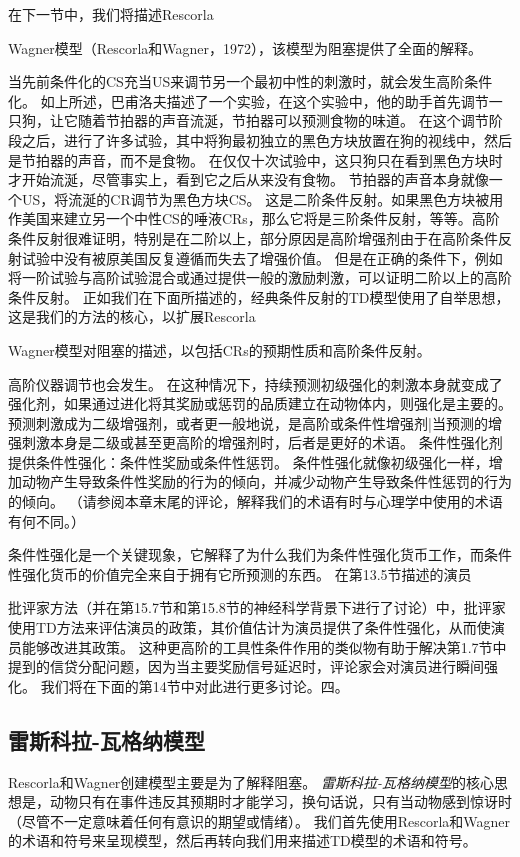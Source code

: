 在下一节中，我们将描述Rescorla{Wagner模型（Rescorla和Wagner，1972），该模型为阻塞提供了全面的解释。
	


当先前条件化的CS充当US来调节另一个最初中性的刺激时，就会发生高阶条件化。
如上所述，巴甫洛夫描述了一个实验，在这个实验中，他的助手首先调节一只狗，让它随着节拍器的声音流涎，节拍器可以预测食物的味道。
在这个调节阶段之后，进行了许多试验，其中将狗最初独立的黑色方块放置在狗的视线中，然后是节拍器的声音，而不是食物。
在仅仅十次试验中，这只狗只在看到黑色方块时才开始流涎，尽管事实上，看到它之后从来没有食物。
节拍器的声音本身就像一个US，将流涎的CR调节为黑色方块CS。
这是二阶条件反射。如果黑色方块被用作美国来建立另一个中性CS的唾液CRs，那么它将是三阶条件反射，等等。高阶条件反射很难证明，特别是在二阶以上，部分原因是高阶增强剂由于在高阶条件反射试验中没有被原美国反复遵循而失去了增强价值。
但是在正确的条件下，例如将一阶试验与高阶试验混合或通过提供一般的激励刺激，可以证明二阶以上的高阶条件反射。
正如我们在下面所描述的，经典条件反射的TD模型使用了自举思想，这是我们的方法的核心，以扩展Rescorla{Wagner模型对阻塞的描述，以包括CRs的预期性质和高阶条件反射。
	
	
高阶仪器调节也会发生。
在这种情况下，持续预测初级强化的刺激本身就变成了强化剂，如果通过进化将其奖励或惩罚的品质建立在动物体内，则强化是主要的。
预测刺激成为二级增强剂，或者更一般地说，是高阶或条件性增强剂|当预测的增强刺激本身是二级或甚至更高阶的增强剂时，后者是更好的术语。
条件性强化剂提供条件性强化：条件性奖励或条件性惩罚。
条件性强化就像初级强化一样，增加动物产生导致条件性奖励的行为的倾向，并减少动物产生导致条件性惩罚的行为的倾向。
（请参阅本章末尾的评论，解释我们的术语有时与心理学中使用的术语有何不同。）



条件性强化是一个关键现象，它解释了为什么我们为条件性强化货币工作，而条件性强化货币的价值完全来自于拥有它所预测的东西。
在第13.5节描述的演员{批评家方法（并在第15.7节和第15.8节的神经科学背景下进行了讨论）中，批评家使用TD方法来评估演员的政策，其价值估计为演员提供了条件性强化，从而使演员能够改进其政策。
这种更高阶的工具性条件作用的类似物有助于解决第1.7节中提到的信贷分配问题，因为当主要奖励信号延迟时，评论家会对演员进行瞬间强化。
我们将在下面的第14节中对此进行更多讨论。四。


\subsection{雷斯科拉-瓦格纳模型}

Rescorla和Wagner创建模型主要是为了解释阻塞。
\textit{雷斯科拉-瓦格纳模型}的核心思想是，动物只有在事件违反其预期时才能学习，换句话说，只有当动物感到惊讶时（尽管不一定意味着任何有意识的期望或情绪）。
我们首先使用Rescorla和Wagner的术语和符号来呈现模型，然后再转向我们用来描述TD模型的术语和符号。


}}}
